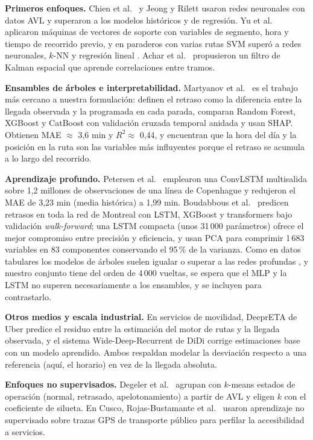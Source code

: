 \documentclass[conference,spanish]{IEEEtran}
\begin{document}
\textbf{Primeros enfoques.} Chien et al.\ \cite{chien2002} y Jeong y Rilett \cite{jeong2004} usaron redes neuronales con datos AVL y superaron a los modelos históricos y de regresión. Yu et al.\ \cite{yu2006} aplicaron máquinas de vectores de soporte con variables de segmento, hora y tiempo de recorrido previo, y en paraderos con varias rutas SVM superó a redes neuronales, $k$-NN y regresión lineal \cite{yu2011}. Achar et al.\ \cite{achar2020} propusieron un filtro de Kalman espacial que aprende correlaciones entre tramos.

\textbf{Ensambles de árboles e interpretabilidad.} Martyanov et al.\ \cite{martyanov2026} es el trabajo más cercano a nuestra formulación: definen el retraso como la diferencia entre la llegada observada y la programada en cada parada, comparan Random Forest, XGBoost y CatBoost con validación cruzada temporal anidada y usan SHAP. Obtienen MAE $\approx$ 3,6 min y $R^2\approx$ 0,44, y encuentran que la hora del día y la posición en la ruta son las variables más influyentes porque el retraso se acumula a lo largo del recorrido.

\textbf{Aprendizaje profundo.} Petersen et al.\ \cite{petersen2019} emplearon una ConvLSTM multisalida sobre 1,2 millones de observaciones de una línea de Copenhague y redujeron el MAE de 3,23 min (media histórica) a 1,99 min. Boudabbous et al.\ \cite{boudabbous2026} predicen retrasos en toda la red de Montreal con LSTM, XGBoost y transformers bajo validación \textit{walk-forward}; una LSTM compacta (unos 31\,000 parámetros) ofrece el mejor compromiso entre precisión y eficiencia, y usan PCA para comprimir 1\,683 variables en 83 componentes conservando el 95\,\% de la varianza. Como en datos tabulares los modelos de árboles suelen igualar o superar a las redes profundas \cite{grinsztajn2022}, y nuestro conjunto tiene del orden de 4\,000 vueltas, se espera que el MLP y la LSTM no superen necesariamente a los ensambles, y se incluyen para contrastarlo.

\textbf{Otros medios y escala industrial.} En servicios de movilidad, DeeprETA de Uber \cite{hu2022deepreta} predice el residuo entre la estimación del motor de rutas y la llegada observada, y el sistema Wide-Deep-Recurrent de DiDi \cite{wang2018wdr} corrige estimaciones base con un modelo aprendido. Ambos respaldan modelar la desviación respecto a una referencia (aquí, el horario) en vez de la llegada absoluta.

\textbf{Enfoques no supervisados.} Degeler et al.\ \cite{degeler2021} agrupan con $k$-means estados de operación (normal, retrasado, apelotonamiento) a partir de AVL y eligen $k$ con el coeficiente de silueta. En Cusco, Rojas-Bustamante et al.\ \cite{rojas2023} usaron aprendizaje no supervisado sobre trazas GPS de transporte público para perfilar la accesibilidad a servicios.
\end{document}
